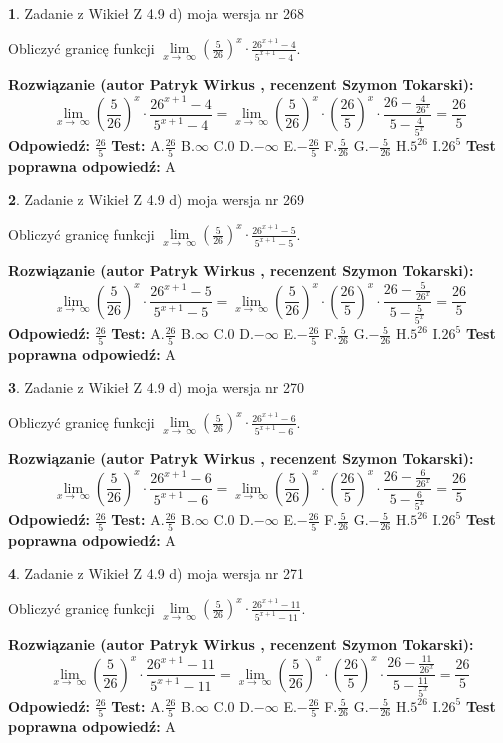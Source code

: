\documentclass[12pt, a4paper]{article}
\theoremstyle{definition} %
\newtheorem{zad}{}
\newcommand{\zadStart}[1]{\begin{zad}#1\newline}
\newcommand{\zadStop}{\end{zad}}
\newcommand{\rozwStart}[2]{\noindent \textbf{Rozwiązanie (autor #1 , recenzent #2): }\newline}
\newcommand{\rozwStop}{\newline}
\newcommand{\odpStart}{\noindent \textbf{Odpowiedź:}\newline}
\newcommand{\odpStop}{\newline}
\newcommand{\testStart}{\noindent \textbf{Test:}\newline}
\newcommand{\testStop}{\newline}
\newcommand{\kluczStart}{\noindent \textbf{Test poprawna odpowiedź:}\newline}
\newcommand{\kluczStop}{\newline}
\begin{document}
\zadStart{Zadanie z Wikieł Z 4.9 d) moja wersja nr 268}


Obliczyć granicę funkcji  $\lim\limits_{x\to\ \infty}(\frac{5}{26})^{x}\cdot\frac{26^{x+1}-4}{5^{x+1}-4}$.
\zadStop
\rozwStart{Patryk Wirkus}{Szymon Tokarski}
$$\lim\limits_{x\to\ \infty}(\frac{5}{26})^{x}\cdot\frac{26^{x+1}-4}{5^{x+1}-4}=\lim\limits_{x\to\ \infty}(\frac{5}{26})^{x}\cdot(\frac{26}{5})^{x} \cdot \frac{26-\frac{4}{26^{x}}}{5-\frac{4}{5^{x}}} = \frac{26}{5}$$
\rozwStop
\odpStart
$\frac{26}{5}$
\odpStop
\testStart
A.$\frac{26}{5}$ B.$\infty$ C.$0$ D.$-\infty$ E.$-\frac{26}{5}$
F.$\frac{5}{26}$ G.$-\frac{5}{26}$
H.$5^{26}$
I.$26^{5}$
\testStop
\kluczStart
A
\kluczStop



\zadStart{Zadanie z Wikieł Z 4.9 d) moja wersja nr 269}


Obliczyć granicę funkcji  $\lim\limits_{x\to\ \infty}(\frac{5}{26})^{x}\cdot\frac{26^{x+1}-5}{5^{x+1}-5}$.
\zadStop
\rozwStart{Patryk Wirkus}{Szymon Tokarski}
$$\lim\limits_{x\to\ \infty}(\frac{5}{26})^{x}\cdot\frac{26^{x+1}-5}{5^{x+1}-5}=\lim\limits_{x\to\ \infty}(\frac{5}{26})^{x}\cdot(\frac{26}{5})^{x} \cdot \frac{26-\frac{5}{26^{x}}}{5-\frac{5}{5^{x}}} = \frac{26}{5}$$
\rozwStop
\odpStart
$\frac{26}{5}$
\odpStop
\testStart
A.$\frac{26}{5}$ B.$\infty$ C.$0$ D.$-\infty$ E.$-\frac{26}{5}$
F.$\frac{5}{26}$ G.$-\frac{5}{26}$
H.$5^{26}$
I.$26^{5}$
\testStop
\kluczStart
A
\kluczStop



\zadStart{Zadanie z Wikieł Z 4.9 d) moja wersja nr 270}


Obliczyć granicę funkcji  $\lim\limits_{x\to\ \infty}(\frac{5}{26})^{x}\cdot\frac{26^{x+1}-6}{5^{x+1}-6}$.
\zadStop
\rozwStart{Patryk Wirkus}{Szymon Tokarski}
$$\lim\limits_{x\to\ \infty}(\frac{5}{26})^{x}\cdot\frac{26^{x+1}-6}{5^{x+1}-6}=\lim\limits_{x\to\ \infty}(\frac{5}{26})^{x}\cdot(\frac{26}{5})^{x} \cdot \frac{26-\frac{6}{26^{x}}}{5-\frac{6}{5^{x}}} = \frac{26}{5}$$
\rozwStop
\odpStart
$\frac{26}{5}$
\odpStop
\testStart
A.$\frac{26}{5}$ B.$\infty$ C.$0$ D.$-\infty$ E.$-\frac{26}{5}$
F.$\frac{5}{26}$ G.$-\frac{5}{26}$
H.$5^{26}$
I.$26^{5}$
\testStop
\kluczStart
A
\kluczStop



\zadStart{Zadanie z Wikieł Z 4.9 d) moja wersja nr 271}


Obliczyć granicę funkcji  $\lim\limits_{x\to\ \infty}(\frac{5}{26})^{x}\cdot\frac{26^{x+1}-11}{5^{x+1}-11}$.
\zadStop
\rozwStart{Patryk Wirkus}{Szymon Tokarski}
$$\lim\limits_{x\to\ \infty}(\frac{5}{26})^{x}\cdot\frac{26^{x+1}-11}{5^{x+1}-11}=\lim\limits_{x\to\ \infty}(\frac{5}{26})^{x}\cdot(\frac{26}{5})^{x} \cdot \frac{26-\frac{11}{26^{x}}}{5-\frac{11}{5^{x}}} = \frac{26}{5}$$
\rozwStop
\odpStart
$\frac{26}{5}$
\odpStop
\testStart
A.$\frac{26}{5}$ B.$\infty$ C.$0$ D.$-\infty$ E.$-\frac{26}{5}$
F.$\frac{5}{26}$ G.$-\frac{5}{26}$
H.$5^{26}$
I.$26^{5}$
\testStop
\kluczStart
A
\kluczStop
\end{document}
